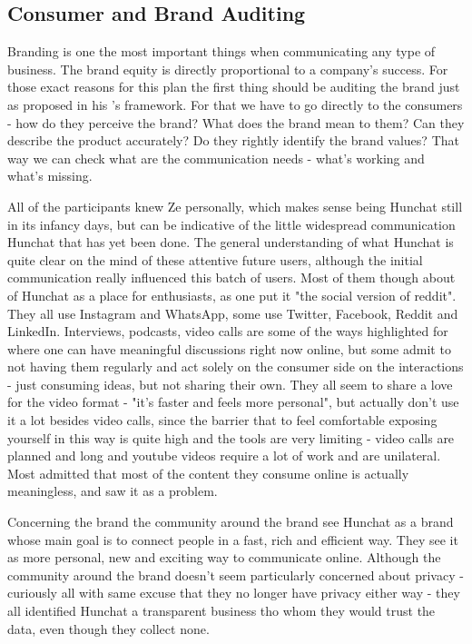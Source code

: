 \documentclass[12pt]{article}
\begin{document}
	
\subsection{Consumer and Brand Auditing}
Branding is one the most important things when communicating any type of business. The brand equity is directly proportional to a company's success. For those exact reasons for this plan the first thing should be auditing the brand just as \citeauthor{kliatchko} proposed in his \citeyear{kliatchko}'s framework. For that we have to go directly to the consumers - how do they perceive the brand? What does the brand mean to them? Can they describe the product accurately? Do they rightly identify the brand values? That way we can check what are the communication needs - what's working and what's missing.

All of the participants knew Ze personally, which makes sense being Hunchat still in its infancy days, but can be indicative of the little widespread communication Hunchat that has yet been done. The general understanding of what Hunchat is quite clear on the mind of these attentive future users, although the initial communication really influenced this batch of users. Most of them though about of Hunchat as a place for enthusiasts, as one put it "the social version of reddit". They all use Instagram and WhatsApp, some use Twitter, Facebook, Reddit and LinkedIn.  Interviews, podcasts, video calls are some of the ways highlighted for where one can have meaningful discussions right now online, but some admit to not having them regularly and act solely on the consumer side on the interactions - just consuming ideas, but not sharing their own. They all seem to share a love for the video format - "it's faster and feels more personal", but actually don't use it a lot besides video calls, since the barrier that  to feel comfortable exposing yourself in this way is quite high and the tools are very limiting - video calls are planned and long and youtube videos require a lot of work and are unilateral. Most admitted that most of the content they consume online is actually meaningless, and saw it as a problem.

Concerning the brand the community around the brand see Hunchat as a brand whose main goal is to connect people in a fast, rich and efficient way. They see it as more personal, new and exciting way to communicate online. Although the community around the brand doesn't seem particularly concerned about privacy - curiously all with same excuse that they no longer have privacy either way - they all identified Hunchat a transparent business tho whom they would trust the data, even though they collect none.
\end{document}
